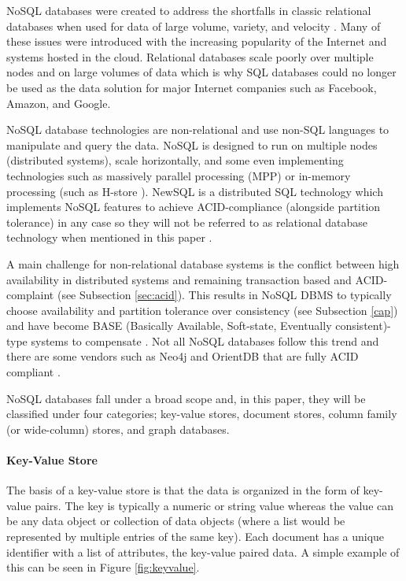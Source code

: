 NoSQL databases were created to address the shortfalls in classic relational databases when used for data of large volume, variety, and velocity \cite{nosql-db}. Many of these issues were introduced with the increasing popularity of the Internet and systems hosted in the cloud. Relational databases scale poorly over multiple nodes and on large volumes of data which is why SQL databases could no longer be used as the data solution for major Internet companies such as Facebook, Amazon, and Google. 

NoSQL database technologies are non-relational and use non-SQL languages to manipulate and query the data. NoSQL is designed to run on multiple nodes (distributed systems), scale horizontally, and some even implementing technologies such as massively parallel processing (MPP) \cite{tigergraph-mpp} or in-memory processing (such as H-store \cite{hstore}). NewSQL is a distributed SQL technology which implements NoSQL features to achieve ACID-compliance (alongside partition tolerance) in any case so they will not be referred to as relational database technology when mentioned in this paper \cite{nosql-db}.

A main challenge for non-relational database systems is the conflict between high availability in distributed systems and remaining transaction based and ACID-complaint (see Subsection \ref{sec:acid}). This results in NoSQL DBMS to typically choose availability and partition tolerance over consistency (see Subsection \ref{cap}) and have become BASE (Basically Available, Soft-state, Eventually consistent)-type systems to compensate \cite{base}. Not all NoSQL databases follow this trend and there are some vendors such as Neo4j and OrientDB that are fully ACID compliant \cite{acid}.

NoSQL databases fall under a broad scope and, in this paper, they will be classified under four categories; key-value stores, document stores, column family (or wide-column) stores, and graph databases.

\paragraph{Key-Value Store}

The basis of a key-value store is that the data is organized in the form of key-value pairs. The key is typically a numeric or string value whereas the value can be any data object or collection of data objects (where a list would be represented by multiple entries of the same key). Each document has a unique identifier with a list of attributes, the key-value paired data. A simple example of this can be seen in Figure \ref{fig:keyvalue}.

